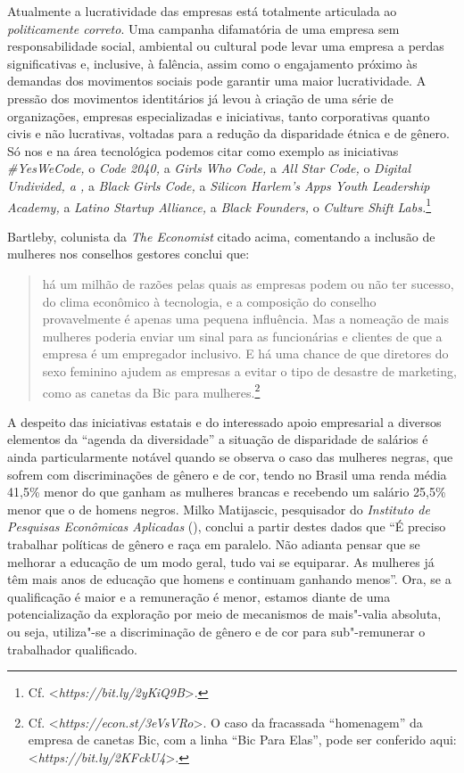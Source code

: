 Atualmente a lucratividade das empresas está totalmente articulada ao
\emph{politicamente correto}. Uma campanha difamatória de uma empresa
sem responsabilidade social, ambiental ou cultural pode levar uma
empresa a perdas significativas e, inclusive, à falência, assim como o
engajamento próximo às demandas dos movimentos sociais pode garantir uma
maior lucratividade. A pressão dos movimentos identitários já levou à
criação de uma série de organizações, empresas especializadas e
iniciativas, tanto corporativas quanto civis e não lucrativas, voltadas
para a redução da disparidade étnica e de gênero. Só nos  e na área
tecnológica podemos citar como exemplo as iniciativas
\emph{\#YesWeCode,} o \emph{Code 2040,} a \emph{Girls Who Code,} a
\emph{All Star Code,} o \emph{Digital Undivided, a ,} a
\emph{Black Girls Code,} a \emph{Silicon Harlem's Apps Youth Leadership
Academy,} a \emph{Latino Startup Alliance,} a \emph{Black Founders,} o
\emph{Culture Shift Labs.}\footnote{Cf.
  \textless{}\emph{https://bit.ly/2yKiQ9B}\textgreater{}.}

Bartleby, colunista da \emph{The Economist} citado acima, comentando a
inclusão de mulheres nos conselhos gestores conclui que:

\begin{quote}
há um milhão de razões pelas quais as empresas podem ou não ter sucesso,
do clima econômico à tecnologia, e a composição do conselho
provavelmente é apenas uma pequena influência. Mas a nomeação de mais
mulheres poderia enviar um sinal para as funcionárias e clientes de que
a empresa é um empregador inclusivo. E há uma chance de que diretores do
sexo feminino ajudem as empresas a evitar o tipo de desastre de
marketing, como as canetas da Bic para mulheres.\footnote{Cf.
  \textless{}\emph{https://econ.st/3eVsVRo}\textgreater{}.
  O caso da fracassada ``homenagem'' da empresa de canetas Bic, com a
  linha ``Bic Para Elas'', pode ser conferido aqui:
  \textless{}\emph{https://bit.ly/2KFckU4}\textgreater{}.}
\end{quote}

A despeito das iniciativas estatais e do interessado apoio empresarial a
diversos elementos da ``agenda da diversidade'' a situação de
disparidade de salários é ainda particularmente notável quando se
observa o caso das mulheres negras, que sofrem com discriminações de
gênero e de cor, tendo no Brasil uma renda média 41,5\% menor do que
ganham as mulheres brancas e recebendo um salário 25,5\% menor que o de
homens negros. Milko Matijascic, pesquisador do \emph{Instituto de
Pesquisas Econômicas Aplicadas} (), conclui a partir destes dados
que ``É preciso trabalhar políticas de gênero e raça em paralelo. Não
adianta pensar que se melhorar a educação de um modo geral, tudo vai se
equiparar. As mulheres já têm mais anos de educação que homens e
continuam ganhando menos''. Ora, se a qualificação é maior e a
remuneração é menor, estamos diante de uma potencialização da exploração
por meio de mecanismos de mais"-valia absoluta, ou seja, utiliza"-se a
discriminação de gênero e de cor para sub"-remunerar o trabalhador
qualificado.

